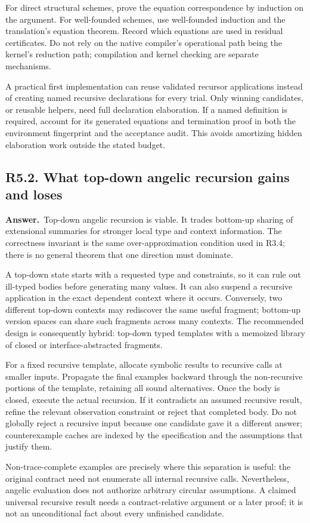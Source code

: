 \documentclass[11pt,a4paper]{article}
\newcommand{\qid}[3]{\subsection{#2. #3}\label{#1}}
\newcommand{\answer}{\noindent\textbf{Answer.}\ }
\theoremstyle{remark}
\begin{document}
For direct structural schemes, prove the equation correspondence by induction on the argument. For well-founded schemes, use well-founded induction and the translation's equation theorem. Record which equations are used in residual certificates. Do not rely on the native compiler's operational path being the kernel's reduction path; compilation and kernel checking are separate mechanisms.~\cite{leancompile}

A practical first implementation can reuse validated recursor applications instead of creating named recursive declarations for every trial. Only winning candidates, or reusable helpers, need full declaration elaboration. If a named definition is required, account for its generated equations and termination proof in both the environment fingerprint and the acceptance audit. This avoids amortizing hidden elaboration work outside the stated budget.

\qid{q52}{R5.2}{What top-down angelic recursion gains and loses}
\answer Top-down angelic recursion is viable. It trades bottom-up sharing of extensional summaries for stronger local type and context information. The correctness invariant is the same over-approximation condition used in R3.4; there is no general theorem that one direction must dominate.

A top-down state starts with a requested type and constraints, so it can rule out ill-typed bodies before generating many values. It can also suspend a recursive application in the exact dependent context where it occurs. Conversely, two different top-down contexts may rediscover the same useful fragment; bottom-up version spaces can share such fragments across many contexts. The recommended design is consequently hybrid: top-down typed templates with a memoized library of closed or interface-abstracted fragments.

For a fixed recursive template, allocate symbolic results to recursive calls at smaller inputs. Propagate the final examples backward through the non-recursive portions of the template, retaining all sound alternatives. Once the body is closed, execute the actual recursion. If it contradicts an assumed recursive result, refine the relevant observation constraint or reject that completed body. Do not globally reject a recursive input because one candidate gave it a different answer; counterexample caches are indexed by the specification and the assumptions that justify them.

Non-trace-complete examples are precisely where this separation is useful: the original contract need not enumerate all internal recursive calls. Nevertheless, angelic evaluation does not authorize arbitrary circular assumptions. A claimed universal recursive result needs a contract-relative argument or a later proof; it is not an unconditional fact about every unfinished candidate.
\end{document}
